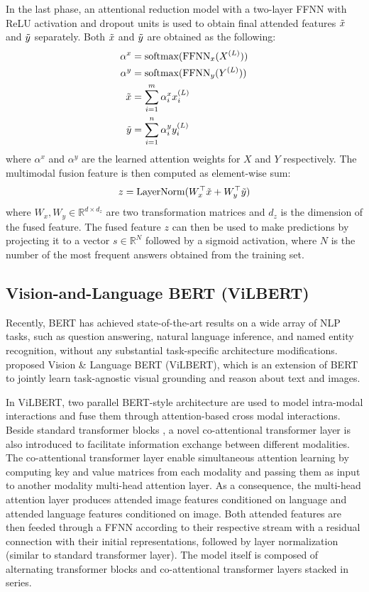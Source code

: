 \documentclass{article}
\begin{document}
In the last phase, an attentional reduction model with a two-layer FFNN with ReLU activation and dropout units is used to obtain final attended features $\Tilde{x}$ and $\Tilde{y}$ separately. Both $\Tilde{x}$ and $\Tilde{y}$ are obtained as the following:
\begin{align}
    \alpha^{x} &= \text{softmax}(\text{FFNN}_{x}(X^{(L)})) \\
    \alpha^{y} &= \text{softmax}(\text{FFNN}_{y}(Y^{(L)})) \\
    \Tilde{x} &= \sum_{i=1}^{m}\alpha^{x}_{i}x^{(L)}_{i} \\ 
     \Tilde{y} &= \sum_{i=1}^{n}\alpha^{y}_{i}y^{(L)}_{i}
\end{align}
where $\alpha^{x}$ and $\alpha^{y}$ are the learned attention weights for $X$ and $Y$ respectively. The multimodal fusion feature is then computed as element-wise sum:
\begin{align}
    z = \text{LayerNorm}(W^{\top}_{x}\Tilde{x} + W^{\top}_{y}\Tilde{y})
\end{align}
where $W_{x}, W_{y} \in \mathbb{R}^{d \times d_{z}}$ are two transformation matrices and $d_{z}$ is the dimension of the fused feature. The fused feature $z$ can then be used to make predictions by projecting it to a vector $s \in \mathbb{R}^{N}$ followed by a sigmoid activation, where $N$ is the number of the most frequent answers obtained from the training set.

\subsection{Vision-and-Language BERT (ViLBERT)}
Recently, BERT \citep{devlin-etal-2019-bert} has achieved state-of-the-art results on a wide array of NLP tasks, such as question answering, natural language inference, and named entity recognition, without any substantial task-specific architecture modifications. \citet{lu2019vilbert} proposed Vision \& Language BERT (ViLBERT), which is an extension of BERT to jointly learn task-agnostic visual grounding and reason about text and images. 

In ViLBERT, two parallel BERT-style architecture are used to model intra-modal interactions and fuse them through attention-based cross modal interactions. Beside standard transformer blocks \citep{transformers}, a novel co-attentional transformer layer is also introduced to facilitate information exchange between different modalities. The co-attentional transformer layer enable simultaneous attention learning by computing key and value matrices from each modality and passing them as input to another modality multi-head attention layer. As a consequence, the multi-head attention layer produces attended image features conditioned on language and attended language features conditioned on image. Both attended features are then feeded through a FFNN according to their respective stream with a residual connection with their initial representations, followed by layer normalization (similar to standard transformer layer). The model itself is composed of alternating transformer blocks and co-attentional transformer layers stacked in series. 
\end{document}
